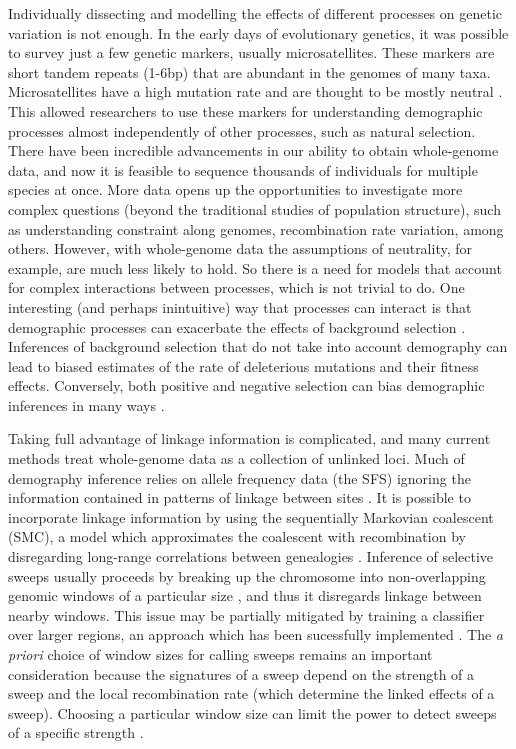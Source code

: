 Individually dissecting and modelling the effects of different processes on genetic variation is not enough.
In the early days of evolutionary genetics, it was possible to survey just a few genetic markers, usually microsatellites.
These markers are short tandem repeats (1-6bp) that are abundant in the genomes of many taxa.
Microsatellites have a high mutation rate and are thought to be mostly neutral \citep{field_long_1997}.
This allowed researchers to use these markers for understanding demographic processes almost independently of other processes, such as natural selection.
There have been incredible advancements in our ability to obtain whole-genome data,
and now it is feasible to sequence thousands of individuals for multiple species at once.
More data opens up the opportunities to investigate more complex questions (\ie beyond the traditional studies of population structure),
such as understanding constraint along genomes, recombination rate variation, among others.
However, with whole-genome data the assumptions of neutrality, for example, are much less likely to hold.
So there is a need for models that account for complex interactions between processes, which is not trivial to do.
One interesting (and perhaps inintuitive) way that processes can interact is that demographic processes can exacerbate the effects of background selection \citep{torres_human_2018, torres_temporal_2020}.
Inferences of background selection that do not take into account demography can lead to biased estimates of the rate of deleterious mutations and their fitness effects.
Conversely, both positive and negative selection can bias demographic inferences in many ways \citep{schrider_effects_2016, ewing_consequences_2016, johri_impact_2021}.

Taking full advantage of linkage information is complicated,
and many current methods treat whole-genome data as a collection of unlinked loci.
Much of demography inference relies on allele frequency data (\ie the SFS) ignoring the information contained in patterns of linkage between sites \citep{gutenkunst_inferring_2009, schraiber_methods_2015}.
It is possible to incorporate linkage information by using the sequentially Markovian coalescent (SMC),
a model which approximates the coalescent with recombination by disregarding long-range correlations between genealogies \citep{schraiber_methods_2015, li_inference_2011, harris_inferring_2013}.
Inference of selective sweeps usually proceeds by breaking up the chromosome into non-overlapping genomic windows of a particular size \citep{degiorgio_sweepfinder2_2016, pavlidis_sweed_2013, garud_recent_2015}, and thus it disregards linkage between nearby windows.
This issue may be partially mitigated by training a classifier over larger regions,
an approach which has been sucessfully implemented \citep{schrider_shic_2016, schrider_soft_2017}.
The \emph{a priori} choice of window sizes for calling sweeps remains an important consideration
because the signatures of a sweep depend on the strength of a sweep and the local recombination rate (which determine the linked effects of a sweep).
Choosing a particular window size can limit the power to detect sweeps of a specific strength \citep{caldas_inference_2022}.

